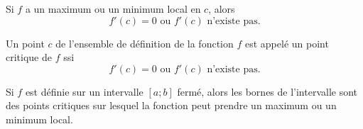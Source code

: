 \begin{figure}[h!]
\begin{subfigure}[b]{0.48\textwidth}
\end{subfigure}

\end{figure}
\begin{thm}
	\tcblower
	Si $f$ a un maximum ou un minimum local en $c$, alors
	\[f'(c)=0 \text{ ou } f'(c) \text{ n'existe pas.}\]
\end{thm}

\begin{definition}
	\tcblower
	Un point $c$ de l'ensemble de définition de la fonction $f$ est appelé un point critique de $f$ ssi
	\[f'(c)=0 \text{ ou } f'(c) \text{ n'existe pas.}\]
\end{definition}
\begin{remarque}
	\tcblower
	Si $f$ est définie sur un intervalle $[a;b]$ fermé, alors les bornes de l'intervalle sont des points critiques sur lesquel la fonction peut prendre un maximum ou un minimum local. 
\end{remarque}

